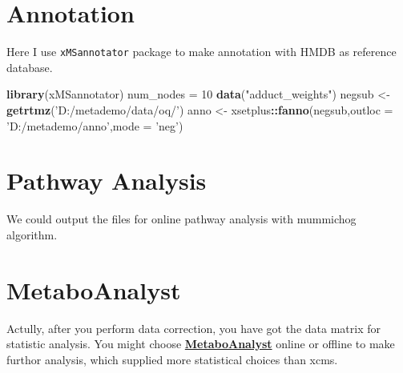 \documentclass[
]{book}
\newenvironment{Shaded}{\begin{snugshade}}{\end{snugshade}}
\newcommand{\CommentTok}[1]{\textcolor[rgb]{0.56,0.35,0.01}{\textit{#1}}}
\newcommand{\DataTypeTok}[1]{\textcolor[rgb]{0.13,0.29,0.53}{#1}}
\newcommand{\DecValTok}[1]{\textcolor[rgb]{0.00,0.00,0.81}{#1}}
\newcommand{\KeywordTok}[1]{\textcolor[rgb]{0.13,0.29,0.53}{\textbf{#1}}}
\newcommand{\NormalTok}[1]{#1}
\newcommand{\OperatorTok}[1]{\textcolor[rgb]{0.81,0.36,0.00}{\textbf{#1}}}
\newcommand{\StringTok}[1]{\textcolor[rgb]{0.31,0.60,0.02}{#1}}
\begin{document}
\hypertarget{annotation-1}{%
\section{Annotation}\label{annotation-1}}

Here I use \texttt{xMSannotator} package to make annotation with HMDB as reference database.

\begin{Shaded}
\begin{Highlighting}[]
\KeywordTok{library}\NormalTok{(xMSannotator)}
\NormalTok{num_nodes =}\StringTok{ }\DecValTok{10}
\KeywordTok{data}\NormalTok{(}\StringTok{"adduct_weights"}\NormalTok{)}
\NormalTok{negsub <-}\StringTok{ }\KeywordTok{getrtmz}\NormalTok{(}\StringTok{'D:/metademo/data/oq/'}\NormalTok{)}
\NormalTok{anno <-}\StringTok{ }\NormalTok{xsetplus}\OperatorTok{::}\KeywordTok{fanno}\NormalTok{(negsub,}\DataTypeTok{outloc =} \StringTok{'D:/metademo/anno'}\NormalTok{,}\DataTypeTok{mode =} \StringTok{'neg'}\NormalTok{)}
\end{Highlighting}
\end{Shaded}

\hypertarget{pathway-analysis-1}{%
\section{Pathway Analysis}\label{pathway-analysis-1}}

We could output the files for online pathway analysis with mummichog algorithm.

\begin{Shaded}
\end{Shaded}

\hypertarget{metaboanalyst}{%
\section{MetaboAnalyst}\label{metaboanalyst}}

Actully, after you perform data correction, you have got the data matrix for statistic analysis. You might choose \href{http://www.metaboanalyst.ca/MetaboAnalyst/faces/docs/Contact.xhtml}{\textbf{MetaboAnalyst}} online or offline to make furthor analysis, which supplied more statistical choices than xcms.
\end{document}
